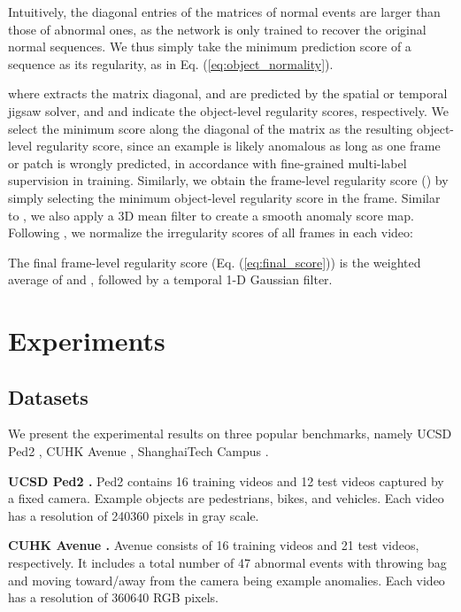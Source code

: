 \documentclass[runningheads]{llncs}
\begin{document}
Intuitively, the diagonal entries of the matrices of normal events are larger than those of abnormal ones, as the network is only trained to recover the original normal sequences. We thus simply take the minimum prediction score of a sequence as its regularity, as in Eq. (\ref{eq:object_normality}).





\noindent where  extracts the matrix diagonal,  and  are predicted by the spatial or temporal jigsaw solver, and  and  indicate the object-level regularity scores, respectively. We select the minimum score along the diagonal of the matrix as the resulting object-level regularity score, since an example is likely anomalous as long as one frame or patch is wrongly predicted, in accordance with fine-grained multi-label supervision in training. Similarly, we obtain the frame-level regularity score  () by simply selecting the minimum object-level regularity score in the frame. Similar to \cite{georgescu2021anomaly}, we also apply a 3D mean filter to create a smooth anomaly score map. Following \cite{liu2018future, feng2021Conv, ye2019anopcn}, we normalize the irregularity scores of all frames in each video:





The final frame-level regularity score  (Eq. (\ref{eq:final_score})) is the weighted average of  and , followed by a temporal 1-D Gaussian filter. 




\section{Experiments}

\subsection{Datasets}

We present the experimental results on three popular benchmarks, namely UCSD Ped2 \cite{mahadevan2010anomaly}, CUHK Avenue \cite{lu2013abnormal}, ShanghaiTech Campus \cite{luo2017revisit}. 

\textbf{UCSD Ped2 \cite{mahadevan2010anomaly}.} Ped2 contains 16 training videos and 12 test videos captured by a fixed camera. Example objects are pedestrians, bikes, and vehicles. Each video has a resolution of 240360 pixels in gray scale.

\textbf{CUHK Avenue \cite{lu2013abnormal}.} Avenue consists of 16 training videos and 21 test videos, respectively. It includes a total number of 47 abnormal events with throwing bag and moving toward/away from the camera being example anomalies. Each video has a resolution of 360640 RGB pixels.
\end{document}
